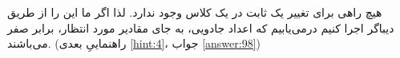 \section{}
\paragraph{}\label{hint:120}
هیچ راهی برای تغییر یک ثابت در یک کلاس وجود ندارد. لذا اگر ما این را از طریق دیباگر اجرا کنیم درمی‌یابیم که اعداد جادویی، به جای مقادیر مورد انتظار، برابر صفر می‌باشند. (راهنماییِ بعدی \ref{hint:4}، جواب \ref{answer:98})